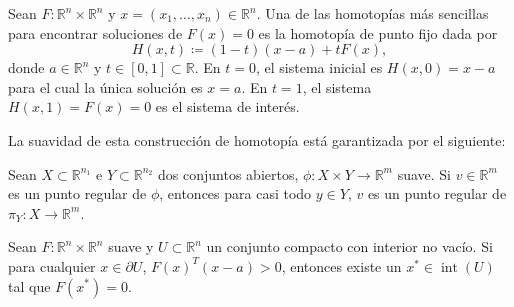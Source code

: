 \begin{frame}
	\begin{definition}
		Sean
		\begin{math}
			F\colon\mathbb{R}^{n}\times\mathbb{R}^{n}
		\end{math}
		y
		\begin{math}
			x=\left(x_{1},\dotsc,x_{n}\right)\in\mathbb{R}^{n}
		\end{math}.
		Una de las homotopías más sencillas para encontrar soluciones de
		$F\left(x\right)=0$ es la \alert{homotopía de punto fijo} dada
		por
		\begin{equation*}
			H\left(x,t\right)\coloneqq
			\left(1-t\right)\left(x-a\right)+tF\left(x\right),
		\end{equation*}
		donde $a\in\mathbb{R}^{n}$ y
		$t\in\left[0,1\right]\subset\mathbb{R}$.
		En $t=0$, el sistema inicial es $H\left(x,0\right)=x-a$
		para el cual la única solución es $x=a$.
		En $t=1$, el sistema $H\left(x,1\right)=F\left(x\right)=0$ es el
		sistema de interés.
	\end{definition}
	La suavidad de esta construcción de homotopía está garantizada por
	el siguiente:
	\begin{theorem}
		Sean $X\subset\mathbb{R}^{n_{1}}$ e $Y\subset\mathbb{R}^{n_{2}}$
		dos conjuntos abiertos, $\phi\colon X\times Y\to\mathbb{R}^{m}$
		suave.
		Si $v\in\mathbb{R}^{m}$ es un punto regular de $\phi$, entonces
		para casi todo $y\in Y$, $v$ es un punto regular de
		$\pi_{Y}\colon X\to\mathbb{R}^{m}$.
	\end{theorem}

	\begin{theorem}
		Sean
		\begin{math}
			F\colon\mathbb{R}^{n}\times\mathbb{R}^{n}
		\end{math}
		suave y $U\subset\mathbb{R}^{n}$ un conjunto compacto con
		interior no vacío.
		Si para cualquier $x\in\partial U$, ${F\left(x\right)}^{T}\left(x-a\right)>0$,
		entonces existe un $x^{\ast}\in\operatorname{int}\left(U\right)$ tal que
		$F\left(x^{\ast}\right)=0$.
	\end{theorem}


\end{frame}

